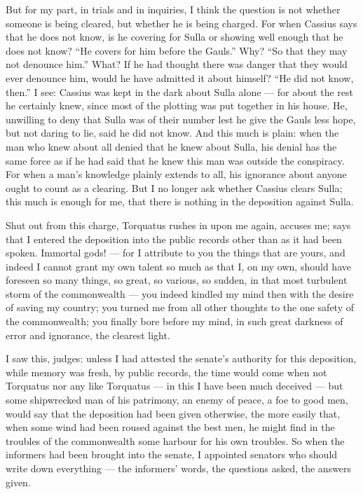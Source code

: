  But for my part, in trials and in inquiries, I think the question is not whether someone is being cleared, but whether he is being charged. For when Cassius says that he does not know, is he covering for Sulla or showing well enough that he does not know? ``He covers for him before the Gauls.'' Why? ``So that they may not denounce him.'' What? If he had thought there was danger that they would ever denounce him, would he have admitted it about himself? ``He did not know, then.'' I see: Cassius was kept in the dark about Sulla alone --- for about the rest he certainly knew, since most of the plotting was put together in his house. He, unwilling to deny that Sulla was of their number lest he give the Gauls less hope, but not daring to lie, said he did not know. And this much is plain: when the man who knew about all denied that he knew about Sulla, his denial has the same force as if he had said that he knew this man was outside the conspiracy. For when a man's knowledge plainly extends to all, his ignorance about anyone ought to count as a clearing. But I no longer ask whether Cassius clears Sulla; this much is enough for me, that there is nothing in the deposition against Sulla.

 Shut out from this charge, Torquatus rushes in upon me again, accuses me; says that I entered the deposition into the public records other than as it had been spoken. Immortal gods! --- for I attribute to you the things that are yours, and indeed I cannot grant my own talent so much as that I, on my own, should have foreseen so many things, so great, so various, so sudden, in that most turbulent storm of the commonwealth --- you indeed kindled my mind then with the desire of saving my country; you turned me from all other thoughts to the one safety of the commonwealth; you finally bore before my mind, in such great darkness of error and ignorance, the clearest light.

 I saw this, judges: unless I had attested the senate's authority for this deposition, while memory was fresh, by public records, the time would come when not Torquatus nor any like Torquatus --- in this I have been much deceived --- but some shipwrecked man of his patrimony, an enemy of peace, a foe to good men, would say that the deposition had been given otherwise, the more easily that, when some wind had been roused against the best men, he might find in the troubles of the commonwealth some harbour for his own troubles. So when the informers had been brought into the senate, I appointed senators who should write down everything --- the informers' words, the questions asked, the answers given.

